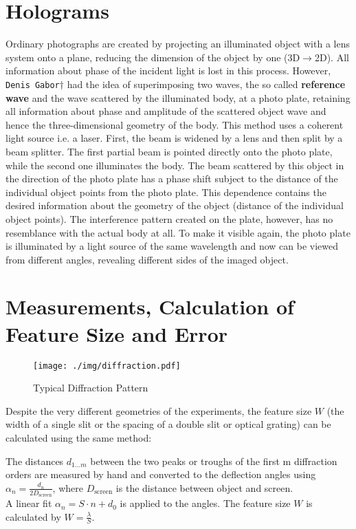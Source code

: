 \section{Holograms}\label{sec:holograms}
Ordinary photographs are created by projecting an illuminated object with a lens system onto a plane, reducing the dimension of the object by one (3D$\rightarrow$2D).
All information about phase of the incident light is lost in this process.
However, \texttt{Denis Gabor}$\dagger$ had the idea of superimposing two waves, the so called \textbf{reference wave} and the wave scattered by the illuminated body, at a photo plate, retaining all information about phase and amplitude of the scattered object wave and hence the three-dimensional geometry of the body.
This method uses a coherent light source i.e. a laser.
First, the beam is widened by a lens and then split by a beam splitter.
The first partial beam is pointed directly onto the photo plate, while the second one illuminates the body.
The beam scattered by this object in the direction of the photo plate has a phase shift subject to the distance of the individual object points from the photo plate.
This dependence contains the desired information about the geometry of the object (distance of the individual object points).
The interference pattern created on the plate, however, has no resemblance with the actual body at all.
To make it visible again, the photo plate is illuminated by a light source of the same wavelength and now can be viewed from different angles, revealing different sides of the imaged object.

\section{Measurements, Calculation of Feature Size and Error}
\begin{figure}[tb]
	\centering
	\texttt{[image: ./img/diffraction.pdf]}
	\caption{Typical Diffraction Pattern}
	\label{fig:diffraction}
\end{figure}
Despite the very different geometries of the experiments, the feature size $W$ (the width of a single slit or the spacing of a double slit or optical grating) can be calculated using the same method:

The distances $d_{1 \dots m}$ between the two peaks or troughs of the first m diffraction orders are measured by hand and converted to the deflection angles using $\alpha_n = \frac{d_n}{2 D_\text{screen}}$, where $D_\text{screen}$ is the distance between object and screen.\\
A linear fit $\alpha_n = S \cdot n + d_0$ is applied to the angles.
The feature size $W$ is calculated by $W = \frac{\lambda}{S}$.

